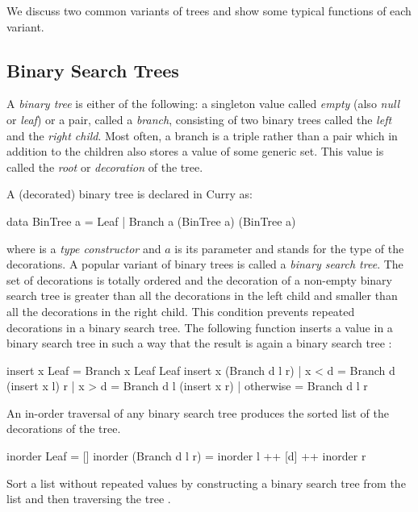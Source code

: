 We discuss two common variants of trees and show some typical functions
of each variant.

\subsection{Binary Search Trees}

A \emph{binary tree} is either of the
following: a singleton value called \emph{empty}
(also \emph{null} or \emph{leaf}) or a pair, called a
\emph{branch}, consisting of two
binary trees called the \emph{left} and the \emph{right child}.
Most often, a branch is a triple rather than a pair
which in addition to the children
also stores a value of some generic set.  This value
is called the \emph{root} or \emph{decoration}
of the tree.

\medskip\noindent
A (decorated) binary tree is declared in Curry as:
%
\begin{curry}
data BinTree a = Leaf | Branch a (BinTree a) (BinTree a)
\end{curry}
%
where  is a \emph{type constructor}
and $a$ is its parameter and stands for the type of the
decorations.
A popular variant of binary trees is called a
\emph{binary search tree}.
The set of decorations is totally ordered and the decoration
of a non-empty binary search tree is greater than all the decorations
in the left child and smaller than all the decorations
in the right child.
This condition prevents repeated decorations in a binary search tree.
The following function inserts a value in a binary search tree
in such a way that the result is again a binary search tree
:
%
\begin{curry}
insert x Leaf = Branch x Leaf Leaf
insert x (Branch d l r)
  | x < d = Branch d (insert x l) r
  | x > d = Branch d l (insert x  r)
  | otherwise = Branch d l r
\end{curry}
%
An in-order traversal of any binary search tree
produces the sorted list of the decorations of the tree.
%
\begin{curry}
inorder Leaf = []
inorder (Branch d l r) = inorder l ++ [d] ++ inorder r
\end{curry}
%
\begin{exercise}
Sort a list without repeated values by constructing
a binary search tree from the list and then traversing the
tree
.
\end{exercise}

